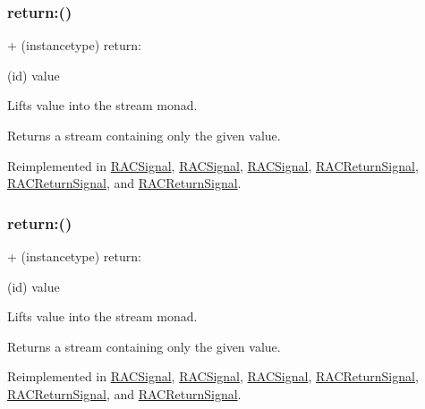 \subsubsection{\texorpdfstring{return\+:()}{return:()}\hspace{0.1cm}{\footnotesize\ttfamily [1/3]}}
{\footnotesize\ttfamily + (instancetype) return\+: \begin{DoxyParamCaption}\item[{(id)}]{value }\end{DoxyParamCaption}}

Lifts {\ttfamily value} into the stream monad.

Returns a stream containing only the given value. 

Reimplemented in \mbox{\hyperlink{interface_r_a_c_signal_a41b2f3cea45bb3a14911299cb572b7d9}{R\+A\+C\+Signal}}, \mbox{\hyperlink{interface_r_a_c_signal_a41b2f3cea45bb3a14911299cb572b7d9}{R\+A\+C\+Signal}}, \mbox{\hyperlink{interface_r_a_c_signal_a41b2f3cea45bb3a14911299cb572b7d9}{R\+A\+C\+Signal}}, \mbox{\hyperlink{interface_r_a_c_return_signal_acaf96978eeb78adb2409b717f26ce665}{R\+A\+C\+Return\+Signal}}, \mbox{\hyperlink{interface_r_a_c_return_signal_acaf96978eeb78adb2409b717f26ce665}{R\+A\+C\+Return\+Signal}}, and \mbox{\hyperlink{interface_r_a_c_return_signal_acaf96978eeb78adb2409b717f26ce665}{R\+A\+C\+Return\+Signal}}.

\mbox{\label{interface_r_a_c_stream_ab3497f3cf2f0d43e90d375dc26ed12ba}} 
\subsubsection{\texorpdfstring{return\+:()}{return:()}\hspace{0.1cm}{\footnotesize\ttfamily [2/3]}}
{\footnotesize\ttfamily + (instancetype) return\+: \begin{DoxyParamCaption}\item[{(id)}]{value }\end{DoxyParamCaption}}

Lifts {\ttfamily value} into the stream monad.

Returns a stream containing only the given value. 

Reimplemented in \mbox{\hyperlink{interface_r_a_c_signal_a41b2f3cea45bb3a14911299cb572b7d9}{R\+A\+C\+Signal}}, \mbox{\hyperlink{interface_r_a_c_signal_a41b2f3cea45bb3a14911299cb572b7d9}{R\+A\+C\+Signal}}, \mbox{\hyperlink{interface_r_a_c_signal_a41b2f3cea45bb3a14911299cb572b7d9}{R\+A\+C\+Signal}}, \mbox{\hyperlink{interface_r_a_c_return_signal_acaf96978eeb78adb2409b717f26ce665}{R\+A\+C\+Return\+Signal}}, \mbox{\hyperlink{interface_r_a_c_return_signal_acaf96978eeb78adb2409b717f26ce665}{R\+A\+C\+Return\+Signal}}, and \mbox{\hyperlink{interface_r_a_c_return_signal_acaf96978eeb78adb2409b717f26ce665}{R\+A\+C\+Return\+Signal}}.


